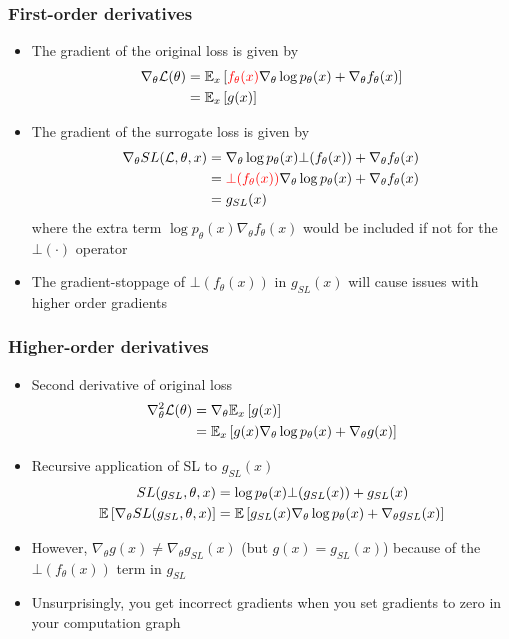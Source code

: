 \documentclass{beamer}
\begin{document}
\begin{frame}
\frametitle{First-order derivatives}
\begin{itemize}
\item The gradient of the original loss is given by
\begin{align*}
\nabla_\theta \mathcal{L}(\theta)
&= \mathbb{E}_{x}\left[\mathbin{\color{red}{f_\theta(x)}}\nabla_\theta \log p_\theta(x) + \nabla_\theta f_\theta(x)\right]\\
&=\mathbb{E}_{x}\left[g(x)\right]
\end{align*}
\item The gradient of the surrogate loss is given by
\begin{align*}
\nabla_\theta SL(\mathcal{L}, \theta, x)
&= \nabla_\theta \log p_\theta(x) \bot(f_\theta(x)) + \nabla_\theta f_\theta(x)\\
&= \mathbin{\color{red}{\bot(f_\theta(x))}}
    \nabla_\theta \log p_\theta(x) + \nabla_\theta f_\theta(x)\\
&= g_{SL}(x)
\end{align*}
where the extra term $\log p_\theta(x) \nabla_\theta f_\theta(x)$ 
would be included if not for the $\bot(\cdot)$ operator
\item The gradient-stoppage of $\bot(f_\theta(x))$ in $g_{SL}(x)$
will cause issues with higher order gradients
\end{itemize}
\end{frame}

\begin{frame}
\frametitle{Higher-order derivatives}
\begin{itemize}
\item Second derivative of original loss
\begin{align*}
\nabla^2_\theta \mathcal{L}(\theta) &= \nabla_\theta\mathbb{E}_{x}\left[g(x)\right]\\
&= \mathbb{E}_{x}\left[g(x)\nabla_\theta\log p_\theta(x) + \nabla_\theta g(x)\right]
\end{align*}
\item Recursive application of SL to $g_{SL}(x)$
\begin{align*}
SL(g_{SL}, \theta, x) &= \log p_\theta(x)\bot(g_{SL}(x)) + g_{SL}(x)\\
\mathbb{E}\left[\nabla_\theta SL(g_{SL}, \theta, x)\right]
&= \mathbb{E}\left[g_{SL}(x)\nabla_\theta\log p_\theta(x) + \nabla_\theta g_{SL}(x)\right]
\end{align*}
\item However, $\nabla_\theta g(x) \neq \nabla_\theta g_{SL}(x)$
(but $g(x) = g_{SL}(x)$)
because of the $\bot(f_\theta(x))$ term in $g_{SL}$
\item Unsurprisingly, you get incorrect gradients when you set
gradients to zero in your computation graph
\end{itemize}
\end{frame}
\end{document}
